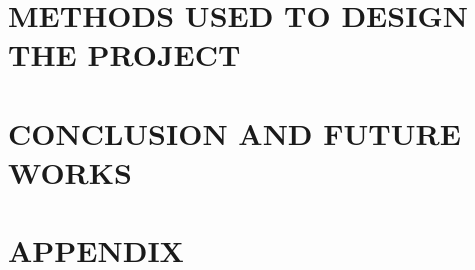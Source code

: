 \documentclass[a4paper,12pt]{extreport}
\begin{document}


\centering
\chapter{\hfil METHODS USED TO DESIGN THE PROJECT \hfil}
\justifying








\newpage
\centering
\chapter{\hfil CONCLUSION AND FUTURE WORKS \hfil}
\justifying

\newpage
\centering
\chapter*{\hfil APPENDIX \hfil}
\justifying



\nocite{*} %

\end{document}
